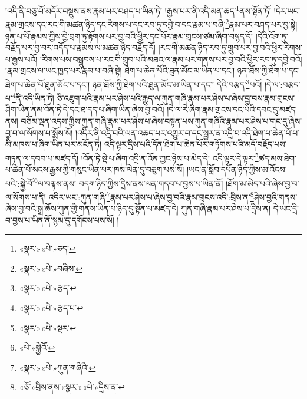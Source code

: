 །འདི་ནི་བཅུ་པོ་མདོར་བསྡུས་ནས་རྣམ་པར་བཤད་པ་ཡིན་ཏེ། །རྒྱས་པར་ནི་འདི་མན་ཆད་\footnote{«སྣར་»«པེ་»ཅད་}ནས་སྟོན་ཏོ། །དེར་ཡང་རྣམ་གྲངས་དང་རང་གི་མཚན་ཉིད་དང་རིགས་པ་དང་རབ་ཏུ་དབྱེ་བ་དང་རྣམ་པ་བཞི་\footnote{«སྣར་»«པེ་»བཞིས་}རྣམ་པར་བཤད་པར་བྱ་སྟེ། ཉན་པ་པོ་རྣམས་ཀྱིས་བྱེ་བྲག་ཏུ་རྟོགས་པར་བྱ་བའི་ཕྱིར་དང་པོར་རྣམ་གྲངས་ཙམ་ཞིག་བསྙད་དོ། །དེའི་འོག་ཏུ་བརྗོད་པར་བྱ་བར་འདོད་པ་རྣམས་ལ་མཚན་ཉིད་བརྗོད་དོ། །རང་གི་མཚན་ཉིད་རབ་ཏུ་གྲུབ་པར་བྱ་བའི་ཕྱིར་རིགས་པ་རྒྱས་པའོ། །རིགས་པས་བསྒྲུབས་པ་རང་གི་གྲུབ་པའི་མཐའ་ལ་རྣམ་པར་གནས་པར་བྱ་བའི་ཕྱིར་རབ་ཏུ་དབྱེ་བའོ། །རྣམ་གྲངས་ལ་ཡང་ཁྱད་པར་རྣམ་པ་བཞི་སྟེ། ཐེག་པ་ཆེན་པོའི་ཐུན་མོང་མ་ཡིན་པ་དང་། ཉན་ཐོས་ཀྱི་ཐེག་པ་དང་ཐེག་པ་ཆེན་པོ་ཐུན་མོང་པ་དང་། ཉན་ཐོས་ཀྱི་ཐེག་པའི་ཐུན་མོང་མ་ཡིན་པ་དང་། དེའི་བརྩད་\footnote{«སྣར་»«པེ་»རྩད་}པའོ། །དེ་ལ་:བརྩད་པ་\footnote{«སྣར་»«པེ་»རྩད་པ་}ནི་འདི་ཡིན་ཏེ། ཅི་འཇུག་པའི་རྣམ་པར་ཤེས་པའི་རྒྱུད་ལ་ཀུན་གཞི་རྣམ་པར་ཤེས་པ་ཞེས་བྱ་བས་རྣམ་གྲངས་ཤིག་ཡིན་ནམ་འོན་ཏེ་དེ་དང་ཐ་དད་པ་ཞིག་ཡིན་ཞེས་བྱ་བའོ། །དེ་ལ་རེ་ཞིག་རྣམ་གྲངས་དང་པོའི་དབང་དུ་མཛད་ནས། བཅོམ་ལྡན་འདས་ཀྱིས་ཀུན་གཞི་རྣམ་པར་ཤེས་པ་ཞེས་བསྟན་པས་ཀུན་གཞིའི་རྣམ་པར་ཤེས་པ་གང་དུ་ཞེས་བྱ་བ་ལ་སོགས་པ་སྨོས་སོ། །འདིར་ནི་འདྲི་བའི་ལན་འཆད་པར་འགྱུར་བ་དང་སྦྱར་ན་འདྲི་བ་འདི་ཐེག་པ་ཆེན་པོ་པ་མི་མཁས་པ་ཞིག་ཡིན་པར་མངོན་ཏེ། འདི་ལྟར་དྲིས་པའི་དོན་ཐེག་པ་ཆེན་པོར་གཏོགས་པའི་མདོ་བརྗོད་པས་གཏན་ལ་དབབ་པ་མཛད་དོ། །འོན་ཏེ་སྡེ་པ་ཞིག་འདྲི་ན་འོན་ཀྱང་ཉེས་པ་མེད་དེ། འདི་ལྟར་དེ་ལྟར་\footnote{«སྣར་»«པེ་»སྔར་}ཚད་མས་ཐེག་པ་ཆེན་པོ་སངས་རྒྱས་ཀྱི་གསུང་ཡིན་པར་ཁས་ལེན་དུ་བཅུག་པས་སོ། །ཡང་ན་སློབ་དཔོན་ཉིད་ཀྱིས་མ་འོངས་པའི་:སྐྱེ་བོ་\footnote{«པེ་»སྐྱེའོ་}ལ་བལྟས་ནས། བདག་ཉིད་ཀྱིས་དྲིས་ནས་ལན་གདབ་པ་བྱས་པ་ཡིན་ནོ། །ཐོག་མ་མེད་པའི་ཞེས་བྱ་བ་ལ་སོགས་པ་ནི། འདིར་ཡང་:ཀུན་གཞི་\footnote{«སྣར་»«པེ་»ཀུན་གཞིའི་}རྣམ་པར་ཤེས་པ་ཞེས་བྱ་བའི་རྣམ་གྲངས་འདི་:བྲིས་ན་\footnote{«ཅོ་»བྲིས་ནས་«སྣར་»«པེ་»དྲིས་ན་}ཤེས་བྱའི་གནས་ཞེས་བྱ་བའི་སྒྲ་ཆོས་ཀུན་གྱི་གནས་ཡིན་པ་ཉིད་དུ་སྟོན་པ་མཛད་དེ། ཀུན་གཞི་རྣམ་པར་ཤེས་པ་དྲིས་ན། དེ་ཡང་དྲི་བ་བྱས་པ་ཡིན་ནོ་སྙམ་དུ་དགོངས་པས་སོ། །
